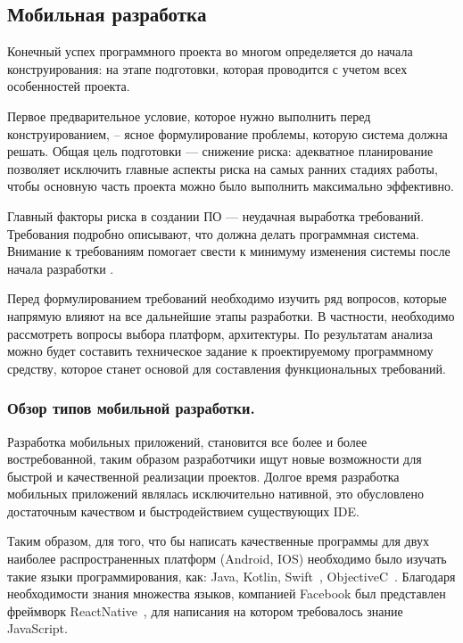 \subsection{Мобильная разработка}
Конечный успех программного проекта во многом определяется до начала конструирования: на этапе подготовки, которая проводится с учетом всех особенностей проекта.

Первое предварительное условие, которое нужно выполнить перед конструированием, -- ясное формулирование проблемы, которую система должна решать. Общая цель подготовки — снижение риска: адекватное планирование позволяет исключить главные аспекты риска на самых ранних стадиях работы, чтобы основную часть проекта можно было выполнить максимально эффективно. 

Главный факторы риска в создании ПО — неудачная выработка требований. Требования подробно описывают, что должна делать программная система. Внимание к требованиям помогает свести к минимуму изменения системы после начала разработки \cite{code_complete}.

Перед формулированием требований необходимо изучить ряд вопросов, которые напрямую влияют на все дальнейшие этапы разработки. В частности, необходимо рассмотреть вопросы выбора платформ, архитектуры. По результатам анализа можно будет составить техническое задание к проектируемому программному средству, которое станет основой для составления функциональных требований.

\subsubsection{Обзор типов мобильной разработки. }
\label{sec:analysis:literature:platforms}

Разработка мобильных приложений, становится все более и более
востребованной, таким образом разработчики ищут новые возможности для
быстрой и качественной реализации проектов. Долгое время разработка
мобильных приложений являлась исключительно нативной, это обусловлено
достаточным качеством и быстродействием существующих IDE.

Таким образом, для того, что бы написать качественные программы для
двух наиболее распространенных платформ (Android, IOS) необходимо было
изучать такие языки программирования, как: Java, Kotlin, Swift~\cite{swift}, ObjectiveC~\cite{objectiveC}. Благодаря необходимости знания множества языков, компанией
Facebook был представлен фреймворк ReactNative~\cite{reactNaitve}, для написания на
котором требовалось знание JavaScript.

